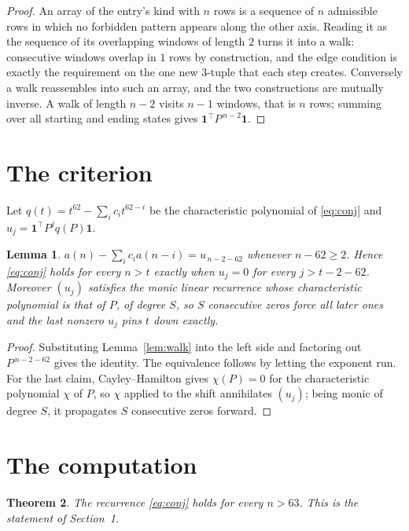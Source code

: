 \documentclass[11pt,a4paper]{article}
\theoremstyle{plain}
\newtheorem{theorem}{Theorem}
\newtheorem{lemma}[theorem]{Lemma}
\theoremstyle{definition}
\begin{document}
\begin{proof}
An array of the entry's kind with $n$ rows is a sequence of $n$ admissible rows in
which no forbidden pattern appears along the other axis. Reading it as the sequence of its
overlapping windows of length $2$ turns it into a walk: consecutive windows overlap in
$1$ rows by construction, and the edge condition is exactly the requirement on the one
new $3$-tuple that each step creates. Conversely a walk reassembles into such an array,
and the two constructions are mutually inverse. A walk of length $n-2$ visits $n-1$
windows, that is $n$ rows; summing over all starting and ending states gives
$\mathbf{1}^{\!\top}P^{\,n-2}\mathbf{1}$.
\end{proof}

\section{The criterion}

Let $q(t)=t^{62}-\sum_i c_i t^{62-i}$ be the characteristic polynomial of
\eqref{eq:conj} and $u_j=\mathbf{1}^{\!\top}P^{j}q(P)\mathbf{1}$.

\begin{lemma}\label{lem:crit}
$a(n)-\sum_i c_i a(n-i)=u_{\,n-2-62}$ whenever $n-62\ge2$. Hence
\eqref{eq:conj} holds for every $n>t$ exactly when $u_j=0$ for every
$j>t-2-62$. Moreover $(u_j)$ satisfies the monic linear recurrence whose
characteristic polynomial is that of $P$, of degree $S$, so $S$ consecutive zeros force all
later ones and the last nonzero $u_j$ pins $t$ down exactly.
\end{lemma}

\begin{proof}
Substituting Lemma~\ref{lem:walk} into the left side and factoring out
$P^{\,n-2-62}$ gives the identity. The equivalence follows by letting the exponent
run. For the last claim, Cayley--Hamilton gives $\chi(P)=0$ for the characteristic
polynomial $\chi$ of $P$, so $\chi$ applied to the shift annihilates $(u_j)$; being monic of
degree $S$, it propagates $S$ consecutive zeros forward.
\end{proof}

\section{The computation}

\begin{theorem}
The recurrence \eqref{eq:conj} holds for every $n>63$. This is the statement of
Section~1.
\end{theorem}
\end{document}
